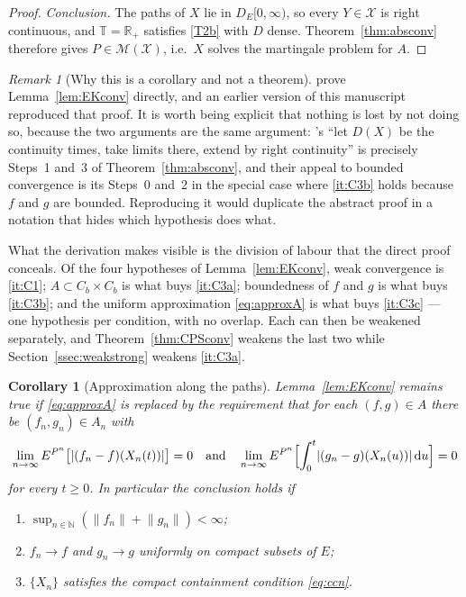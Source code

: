\documentclass[11pt,a4paper]{article}
\theoremstyle{plain}
\newtheorem{corollary}[theorem]{Corollary}
\theoremstyle{definition}
\theoremstyle{remark}
\newtheorem{remark}[theorem]{Remark}
\newcommand{\R}{\mathbb{R}}
\newcommand{\N}{\mathbb{N}}
\newcommand{\Rp}{\R_+}
\newcommand{\T}{\mathbb{T}}                     %
\newcommand{\Cb}{C_b}                          %
\newcommand{\DE}{D_E[0,\infty)}
\newcommand{\XX}{\mathcal{X}}                  %
\newcommand{\Msol}{\mathcal{M}}
\newcommand{\dif}{\,\mathrm{d}}
\newcommand{\EK}{\cite{EK86}}
\begin{document}
\begin{proof}
  \emph{Conclusion.}  The paths of $X$ lie in $\DE$, so every $Y \in \XX$ is
  right continuous, and $\T = \Rp$ satisfies \eqref{T2b} with $D$ dense.
  Theorem~\ref{thm:absconv} therefore gives $P \in \Msol(\XX)$, i.e.\ $X$ solves
  the martingale problem for $A$.
\end{proof}

\begin{remark}[Why this is a corollary and not a theorem]
  \label{rem:EKconvcor}
  \EK{} prove Lemma~\ref{lem:EKconv} directly, and an earlier version of this
  manuscript reproduced that proof.  It is worth being explicit that nothing is
  lost by not doing so, because the two arguments are the same argument:
  \EK's ``let $D(X)$ be the continuity times, take limits there, extend by right
  continuity'' is precisely Steps~1 and~3 of Theorem~\ref{thm:absconv}, and their
  appeal to bounded convergence is its Steps~0 and~2 in the special case where
  \ref{it:C3b} holds because $f$ and $g$ are bounded.  Reproducing it would
  duplicate the abstract proof in a notation that hides which hypothesis does
  what.

  What the derivation makes visible is the division of labour that the direct
  proof conceals.  Of the four hypotheses of Lemma~\ref{lem:EKconv}, weak
  convergence is \ref{it:C1}; $A \subset \Cb \times \Cb$ is what buys
  \ref{it:C3a}; boundedness of $f$ and $g$ is what buys \ref{it:C3b}; and the
  uniform approximation \eqref{eq:approxA} is what buys \ref{it:C3c} --- one
  hypothesis per condition, with no overlap.  Each can then be weakened
  separately, and Theorem~\ref{thm:CPSconv} weakens the last two while
  Section~\ref{ssec:weakstrong} weakens \ref{it:C3a}.
\end{remark}

\begin{corollary}[Approximation along the paths]
  \label{cor:EKconvpath}
  Lemma~\ref{lem:EKconv} remains true if \eqref{eq:approxA} is replaced by the
  requirement that for each $(f,g) \in A$ there be $(f_n,g_n) \in A_n$ with
  \begin{equation}
    \label{eq:approxpath}
    \lim_{n \to \infty} E^{P^n}\bigl[ \lvert (f_n-f)(X_n(t)) \rvert \bigr] = 0
    \quad\text{and}\quad
    \lim_{n \to \infty} E^{P^n}\Bigl[ \int_0^t \lvert (g_n-g)(X_n(u)) \rvert \dif u \Bigr] = 0
  \end{equation}
  for every $t \geq 0$.  In particular the conclusion holds if
  \begin{enumerate}[label=(\alph*)]
  \item \label{it:ap_bdd} $\sup_{n \in \N} ( \lVert f_n \rVert + \lVert g_n \rVert ) < \infty$;
  \item \label{it:ap_ucc} $f_n \to f$ and $g_n \to g$ uniformly on compact subsets of $E$;
  \item \label{it:ap_cc} $\{X_n\}$ satisfies the compact containment condition \eqref{eq:ccn}.
  \end{enumerate}
\end{corollary}
\end{document}
